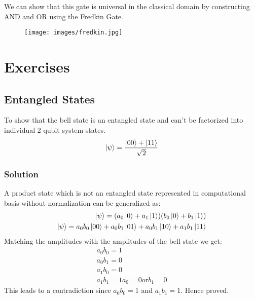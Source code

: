 \documentclass[11.5pt, paper=a4]{article}
\theoremstyle{definition}
\numberwithin{theorem}{section}
\begin{document}
We can show that this gate is universal in the classical domain by constructing AND and OR using the Fredkin Gate.

\begin{figure}[H]
    \centering
    \texttt{[image: images/fredkin.jpg]}
    \label{fig:my_label}
\end{figure}

\section*{Exercises}
\subsection{Entangled States}
To show that the bell state is an entangled state and can't be factorized into individual 2 qubit system states.
\begin{equation*}
    \ket{\psi} = \frac{\ket{00} + \ket{11}}{\sqrt{2}}
\end{equation*}
\subsubsection{Solution}
A product state which is not an entangled state represented in computational basis without normalization can be generalized as:
\begin{align*}
    \ket{\psi} = (a_0 \ket{0} + a_1 \ket{1})(b_0\ket{0} + b_1\ket{1}) \\
    \ket{\psi} = a_0 b_0\ket{00} + a_0 b_1\ket{01} + a_0 b_1\ket{10} + a_1 b_1\ket{11}
\end{align*}
Matching the amplitudes with the amplitudes of the bell state we get:
\begin{align*}
    a_0b_0 = 1 \\ a_0b_1 = 0 \\ a_1b_0 = 0 \\ a_1b_1 = 1
    a_0 = 0 \text{or} b_1 = 0
\end{align*}
This leads to a contradiction since $a_0b_0 = 1$ and $a_1b_1 = 1$. Hence proved.

\nocite{*}


\end{document}
